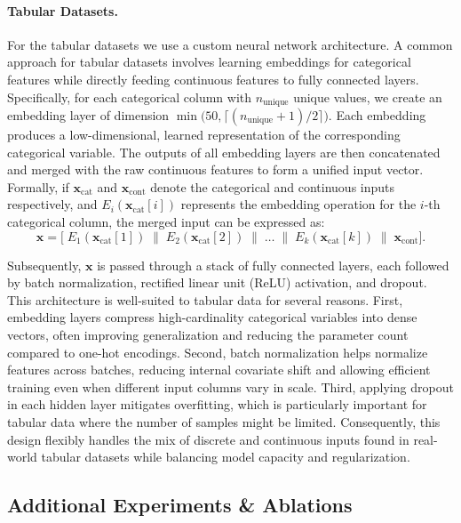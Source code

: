 \paragraph{Tabular Datasets.} For the tabular datasets we use a custom neural network architecture. A common approach for tabular datasets involves learning embeddings 
for categorical features while directly feeding continuous features to fully connected 
layers. Specifically, for each categorical column with $n_\text{unique}$ unique values, 
we create an embedding layer of dimension 
$\min\bigl(50, \lceil (n_\text{unique} + 1)/2 \rceil \bigr)$.
Each embedding produces a low-dimensional, learned representation of the corresponding 
categorical variable. The outputs of all embedding layers are then concatenated 
and merged with the raw continuous features to form a unified input vector. 
Formally, if $\mathbf{x}_\text{cat}$ and $\mathbf{x}_\text{cont}$ denote the 
categorical and continuous inputs respectively, and $E_i(\mathbf{x}_\text{cat}[i])$ 
represents the embedding operation for the $i$-th categorical column, the merged input 
can be expressed as:
\begin{equation*}
    \mathbf{x} = \bigl[\; E_1(\mathbf{x}_\text{cat}[1]) \;\| \; E_2(\mathbf{x}_\text{cat}[2]) 
  \;\|\;\dots\;\|\;E_k(\mathbf{x}_\text{cat}[k]) \;\|\; \mathbf{x}_\text{cont} \bigr].
\end{equation*}
  

Subsequently, $\mathbf{x}$ is passed through a stack of fully connected layers, each 
followed by batch normalization, rectified linear unit (ReLU) activation, and dropout. This architecture is well-suited to tabular data for several reasons. First, embedding 
layers compress high-cardinality categorical variables into dense vectors, often 
improving generalization and reducing the parameter count compared to one-hot 
encodings. Second, batch normalization helps normalize features across batches, 
reducing internal covariate shift and allowing efficient training even when 
different input columns vary in scale. Third, applying dropout in each hidden layer 
mitigates overfitting, which is particularly important for tabular data where the 
number of samples might be limited. Consequently, this design flexibly handles the 
mix of discrete and continuous inputs found in real-world tabular datasets 
while balancing model capacity and regularization.

\subsection{Additional Experiments \& Ablations}
\label{app:add_exp_abl}

